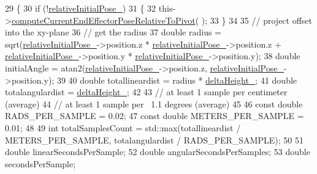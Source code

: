 \begin{DoxyCode}
29     \{
30         \textcolor{keywordflow}{if} (!\hyperlink{classcl__move__group__interface_1_1CbCircularPouringMotion_ab6323315364e1f8bc60cbad3daa72fa9}{relativeInitialPose\_})
31         \{
32             this->\hyperlink{classcl__move__group__interface_1_1CbCircularPouringMotion_a4986b396e0ba318a0046feea3f6eede6}{computeCurrentEndEffectorPoseRelativeToPivot}(
      );
33         \}
34 
35         \textcolor{comment}{// project offset into the xy-plane}
36         \textcolor{comment}{// get the radius}
37         \textcolor{keywordtype}{double} radius = sqrt(\hyperlink{classcl__move__group__interface_1_1CbCircularPouringMotion_ab6323315364e1f8bc60cbad3daa72fa9}{relativeInitialPose\_}->position.z * 
      \hyperlink{classcl__move__group__interface_1_1CbCircularPouringMotion_ab6323315364e1f8bc60cbad3daa72fa9}{relativeInitialPose\_}->position.z + \hyperlink{classcl__move__group__interface_1_1CbCircularPouringMotion_ab6323315364e1f8bc60cbad3daa72fa9}{relativeInitialPose\_}->position.y
       * \hyperlink{classcl__move__group__interface_1_1CbCircularPouringMotion_ab6323315364e1f8bc60cbad3daa72fa9}{relativeInitialPose\_}->position.y);
38         \textcolor{keywordtype}{double} initialAngle = atan2(\hyperlink{classcl__move__group__interface_1_1CbCircularPouringMotion_ab6323315364e1f8bc60cbad3daa72fa9}{relativeInitialPose\_}->position.z, 
      \hyperlink{classcl__move__group__interface_1_1CbCircularPouringMotion_ab6323315364e1f8bc60cbad3daa72fa9}{relativeInitialPose\_}->position.y);
39 
40         \textcolor{keywordtype}{double} totallineardist = radius * \hyperlink{classcl__move__group__interface_1_1CbCircularPouringMotion_a7009d617bcd8ac1fba49100444434f3c}{deltaHeight\_};
41         \textcolor{keywordtype}{double} totalangulardist = \hyperlink{classcl__move__group__interface_1_1CbCircularPouringMotion_a7009d617bcd8ac1fba49100444434f3c}{deltaHeight\_};
42 
43         \textcolor{comment}{// at least 1 sample per centimeter (average)}
44         \textcolor{comment}{// at least 1 sample per ~1.1 degrees (average)}
45 
46         \textcolor{keyword}{const} \textcolor{keywordtype}{double} RADS\_PER\_SAMPLE = 0.02;
47         \textcolor{keyword}{const} \textcolor{keywordtype}{double} METERS\_PER\_SAMPLE = 0.01;
48 
49         \textcolor{keywordtype}{int} totalSamplesCount = std::max(totallineardist / METERS\_PER\_SAMPLE, totalangulardist / 
      RADS\_PER\_SAMPLE);
50 
51         \textcolor{keywordtype}{double} linearSecondsPerSample;
52         \textcolor{keywordtype}{double} angularSecondsPerSamples;
53         \textcolor{keywordtype}{double} secondsPerSample;

\end{DoxyCode}

